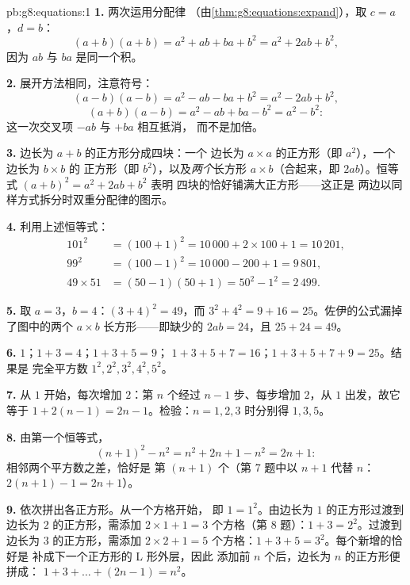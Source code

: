 \begin{solution}{pb:g8:equations:1}
\textbf{1.} 两次运用分配律
（由\cref{thm:g8:equations:expand}），取 $c = a$，$d = b$：
\[
(a + b)(a + b) = a^2 + ab + ba + b^2 = a^2 + 2ab + b^2 ,
\]
因为 $ab$ 与 $ba$ 是同一个积。

\textbf{2.} 展开方法相同，注意符号：
\[
(a - b)(a - b) = a^2 - ab - ba + b^2 = a^2 - 2ab + b^2 ,
\]
\[
(a + b)(a - b) = a^2 - ab + ba - b^2 = a^2 - b^2 :
\]
这一次交叉项 $-ab$ 与 $+ba$ 相互抵消，
而不是加倍。

\textbf{3.} 边长为 $a + b$ 的正方形分成四块：一个
边长为 $a \times a$ 的正方形（即 $a^2$），一个边长为 $b \times b$ 的
正方形（即 $b^2$），以及\emph{两个}长方形 $a \times b$（合起来，即
$2ab$）。恒等式 $(a+b)^2 = a^2 + 2ab + b^2$ 表明
四块的恰好铺满大正方形——这正是
两边以同样方式拆分时双重分配律的图示。

\textbf{4.} 利用上述恒等式：
\begin{align*}
101^2 &= (100 + 1)^2 = 10\,000 + 2 \times 100 + 1 = 10\,201, \\
99^2 &= (100 - 1)^2 = 10\,000 - 200 + 1 = 9\,801, \\
49 \times 51 &= (50 - 1)(50 + 1) = 50^2 - 1^2 = 2\,499 .
\end{align*}

\textbf{5.} 取 $a = 3$，$b = 4$：$(3 + 4)^2 = 49$，而
$3^2 + 4^2 = 9 + 16 = 25$。佐伊的公式漏掉了图中的两个
$a \times b$ 长方形——即缺少的
$2ab = 24$，且 $25 + 24 = 49$。

\textbf{6.} $1$；$1 + 3 = 4$；$1 + 3 + 5 = 9$；
$1 + 3 + 5 + 7 = 16$；$1 + 3 + 5 + 7 + 9 = 25$。结果是
完全平方数 $1^2, 2^2, 3^2, 4^2, 5^2$。

\textbf{7.} 从 $1$ 开始，每次增加
$2$：第 $n$ 个经过 $n - 1$ 步、每步增加 $2$，从
$1$ 出发，故它等于 $1 + 2(n - 1) = 2n - 1$。检验：$n = 1, 2, 3$
时分别得 $1, 3, 5$。

\textbf{8.} 由第一个恒等式，
\[
(n + 1)^2 - n^2 = n^2 + 2n + 1 - n^2 = 2n + 1 :
\]
相邻两个平方数之差，恰好是
第 $(n+1)$ 个（第 7 题中以 $n + 1$ 代替 $n$：
$2(n+1) - 1 = 2n + 1$）。

\textbf{9.} 依次拼出各正方形。从一个方格开始，
即 $1 = 1^2$。由边长为 $1$ 的正方形过渡到
边长为 $2$ 的正方形，需添加 $2 \times 1 + 1 = 3$ 个方格（第
8 题）：$1 + 3 = 2^2$。过渡到边长为 $3$ 的正方形，需添加 $2 \times 2 + 1 = 5$
个方格：$1 + 3 + 5 = 3^2$。每个新增的恰好是
补成下一个正方形的 L 形外层，因此
添加前 $n$ 个后，边长为 $n$ 的正方形便拼成：
$1 + 3 + \dots + (2n - 1) = n^2$。


\end{solution}
